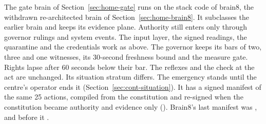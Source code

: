 The gate brain of Section~\ref{sec:home-gate} runs on the stack code of brain8, the withdrawn
re-architected brain of Section~\ref{sec:home-brain8}. It subclasses the earlier brain and keeps its
evidence plane. Authority still enters only through governor rulings and system events. The input
layer, the signed readings, the quarantine and the credentials work as above. The governor keeps
its bars of two, three and one witnesses, its 30-second freshness bound and the measure gate. Rights
lapse after 60 seconds below their bar. The reflexes and the check at the act are unchanged. Its
situation stratum differs. The emergency stands until the centre's operator ends it
(Section~\ref{sec:cont-situation}). It has a signed manifest of the same 25 actions, compiled from
the constitution and re-signed when the constitution became authority and evidence only
(). Brain8's last manifest was , and before it .

